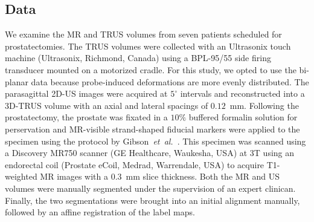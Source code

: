 \documentclass[runningheads,a4paper]{llncs}
\begin{document}
\subsection{Data}\label{sec:data}
We examine the MR and TRUS volumes from seven patients scheduled for prostatectomies. The TRUS volumes were collected with an Ultrasonix touch machine (Ultrasonix, Richmond, Canada) using a BPL-95/55 side firing transducer mounted on a motorized cradle. For this study, we opted to use the bi-planar data because probe-induced deformations are more evenly distributed. The parasagittal 2D-US images were acquired at $5^\circ$ intervals and reconstructed into a 3D-TRUS volume with an axial and lateral spacings of $0.12$~mm. Following the prostatectomy, the prostate was fixated in a $10\%$ buffered formalin solution for perservation and MR-visible strand-shaped fiducial markers were applied to the specimen using the protocol by Gibson~\textit{et~al.}~\cite{Gibson12a}. This specimen was scanned using a Discovery MR750 scanner (GE Healthcare, Waukesha, USA) at 3T using an endorectal coil (Prostate eCoil, Medrad, Warrendale, USA) to acquire T1-weighted MR images with a $0.3$~mm slice thickness. Both the MR and US volumes were manually segmented under the supervision of an expert clinican. Finally, the two segmentations were brought into an initial alignment manually, followed by an affine registration of the label maps.
\end{document}
